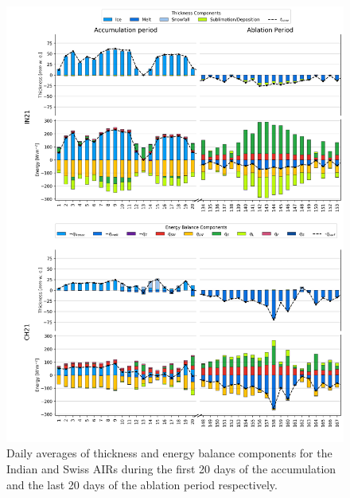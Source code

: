 \documentclass[utf8]{frontiersSCNS}
\begin{document}
\begin{figure}
	\begin{center}
		\includegraphics[width=\linewidth]{Figures/mass_energy_bal.jpg} \end{center}
	\caption{Daily averages of thickness and energy balance components for the Indian and Swiss AIRs during the
		first 20 days of the accumulation and the last 20 days of the ablation period respectively.  } \label{fig:MEB}
\end{figure}
\end{document}
